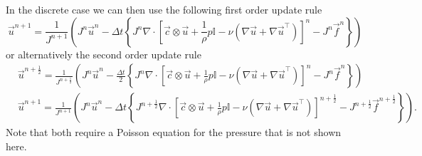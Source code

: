 \documentclass{article}
\begin{document}
In the discrete case we can then use the following first order update rule
\begin{equation}
        \vec{u}^{n+1} =
        \frac{1}{J^{n+1}} \left(
            J^{n} \vec{u}^{n} -
            \Delta t \left\{
                J^{n} \nabla \cdot \left[
                    \vec{c} \otimes \vec{u}
                    + \frac{1}{\rho} p \mathbb{I}
                    - \nu \left(\nabla \vec{u} + \nabla \vec{u}^\top\right)
                \right]^{n} -
                J^{n} \vec{f}^{n}
            \right\}
        \right)
\end{equation}
or alternatively the second order update rule
\begin{equation}
    \begin{split}
        &\vec{u}^{n+\tfrac12} =
        \frac{1}{J^{n+\tfrac12}} \left(
            J^{n} \vec{u}^{n} -
            \frac{\Delta t}{2} \left\{
                J^{n} \nabla \cdot \left[
                    \vec{c} \otimes \vec{u}
                    + \frac{1}{\rho} p \mathbb{I}
                    - \nu \left(\nabla \vec{u} + \nabla \vec{u}^\top\right)
                \right]^{n} -
                J^{n} \vec{f}^{n}
            \right\}
        \right) \\
        &\vec{u}^{n+1} =
        \frac{1}{J^{n+1}} \left(
            J^{n} \vec{u}^{n} -
            \Delta t \left\{
                J^{n+\tfrac12} \nabla \cdot \left[
                    \vec{c} \otimes \vec{u}
                    + \frac{1}{\rho} p \mathbb{I}
                    - \nu \left(\nabla \vec{u} + \nabla \vec{u}^\top\right)
                \right]^{n+\tfrac12} -
                J^{n+\tfrac12} \vec{f}^{n+\tfrac12}
            \right\}
        \right).
    \end{split}
\end{equation}
Note that both require a Poisson equation for the pressure that is not shown here.
\end{document}
